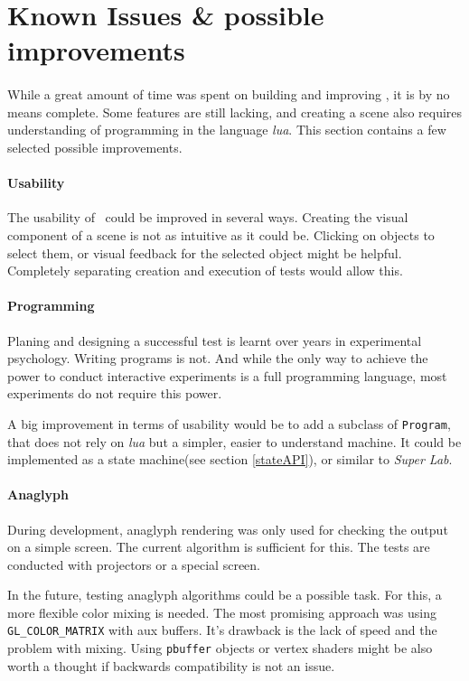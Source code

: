 \section{Known Issues \& possible improvements}
\paragraph{}
While a great amount of time was spent on building and improving \ER, it is by no means complete.
Some features are still lacking, and creating a scene also requires understanding of programming in the language \textit{lua}.
This section contains a few selected possible improvements.

\paragraph{Usability}
The usability of \ER\ could be improved in several ways.
Creating the visual component of a scene is not as intuitive as it could be.
Clicking on objects to select them, or visual feedback for the selected object might be helpful.
Completely separating creation and execution of tests would allow this.

\paragraph{Programming}
Planing and designing a successful test is learnt over years in experimental psychology.
Writing programs is not.
And while the only way to achieve the power to conduct interactive experiments is a full programming language, most experiments do not require this power.

A big improvement in terms of usability would be to add a subclass of \lstinline{Program}, that does not rely on \textit{lua} but a simpler, easier to understand machine.
It could be implemented as a state machine(see section \ref{stateAPI}), or similar to \textit{Super Lab}\cite{superlab}.

\paragraph{Anaglyph}
During development, anaglyph rendering was only used for checking the output on a simple screen.
The current algorithm is sufficient for this.
The tests are conducted with projectors or a special screen.

In the future, testing anaglyph algorithms could be a possible task.
For this, a more flexible color mixing is needed.
The most promising approach was using \lstinline{GL_COLOR_MATRIX} with aux buffers.
It's drawback is the lack of speed and the problem with mixing.
Using \lstinline{pbuffer} objects or vertex shaders might be also worth a thought if backwards compatibility is not an issue.

